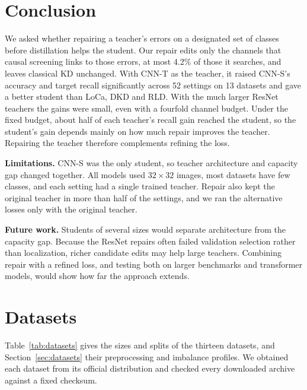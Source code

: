 \documentclass[review,number,sort&compress]{elsarticle}
\theoremstyle{definition}
\begin{document}
\FloatBarrier
\section{Conclusion}
\label{sec:conclusion}

We asked whether repairing a teacher's errors on a designated set of
classes before distillation helps the student. Our repair edits only
the channels that causal screening links to those errors, at most
4.2\% of those it searches, and leaves classical KD unchanged. With
CNN-T as the teacher, it raised CNN-S's accuracy and target recall
significantly across 52 settings on 13 datasets and gave a better
student than LoCa, DKD and RLD. With the much larger ResNet teachers
the gains were small, even with a fourfold channel budget. Under the
fixed budget, about half of each teacher's recall gain reached the
student, so the student's gain depends mainly on how much repair
improves the teacher. Repairing the teacher therefore complements
refining the loss.

\textbf{Limitations.} CNN-S was the only student, so teacher
architecture and capacity gap changed together. All models used
$32\times32$ images, most datasets have few classes, and each setting
had a single trained teacher. Repair also kept the original teacher in
more than half of the settings, and we ran the alternative losses only
with the original teacher.

\textbf{Future work.} Students of several sizes would separate
architecture from the capacity gap. Because the ResNet repairs often
failed validation selection rather than localization, richer candidate
edits may help large teachers. Combining repair with a refined loss,
and testing both on larger benchmarks and transformer models, would
show how far the approach extends.

\FloatBarrier
\appendix
\renewcommand{\thetable}{\Alph{section}.\arabic{table}}
\section{Datasets}
\label{app:datasets}

Table~\ref{tab:datasets} gives the sizes and splits of the thirteen
datasets, and Section~\ref{sec:datasets} their preprocessing and
imbalance profiles.
We obtained each dataset from its official distribution and checked
every downloaded archive against a fixed checksum.
\end{document}
